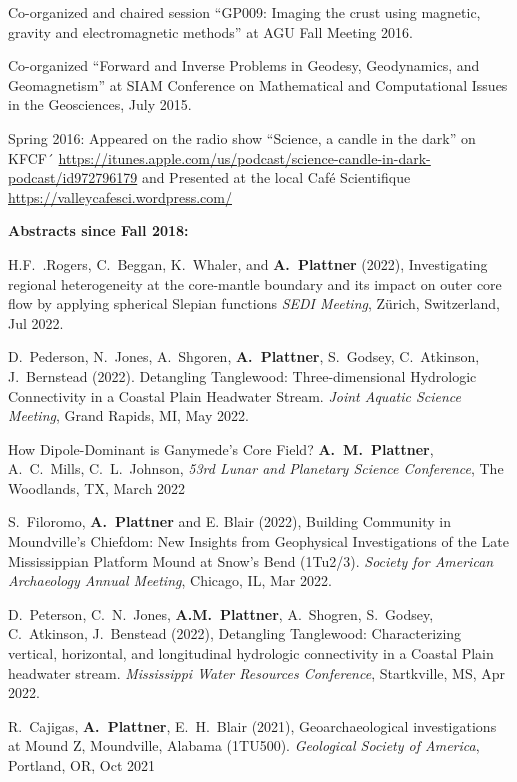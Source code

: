 \documentclass[10pt]{article}
\begin{document}
\spcp
Co-organized and chaired session
``GP009: Imaging the crust using magnetic, gravity and electromagnetic methods''
at AGU Fall Meeting 2016.

\spcp Co-organized ``Forward and Inverse Problems in Geodesy,
Geodynamics, and Geomagnetism'' at SIAM Conference on Mathematical and
Computational Issues in the Geosciences, July 2015.

\spcp
Spring 2016: Appeared on the radio show ``Science, a candle in the dark'' on KFCF´
\url{https://itunes.apple.com/us/podcast/science-candle-in-dark-podcast/id972796179} and Presented at the local Caf\'e Scientifique \url{https://valleycafesci.wordpress.com/}


\spc
\textbf{\tsize Abstracts since Fall 2018:}

\spcp H.F.~.Rogers, C.~Beggan, K.~Whaler, and \textbf{A.~Plattner}
(2022), Investigating regional heterogeneity at the core-mantle
boundary and its impact on outer core flow by applying spherical
Slepian functions \emph{SEDI Meeting}, Z\"urich, Switzerland, Jul 2022.

\spcp D.~Pederson, N.~Jones, A.~Shgoren, \textbf{A.~Plattner},
S.~Godsey, C.~Atkinson, J.~Bernstead (2022). Detangling Tanglewood:
Three-dimensional Hydrologic Connectivity in a Coastal Plain Headwater
Stream. \emph{Joint Aquatic Science Meeting}, Grand Rapids, MI, May
2022.

\spcp How Dipole-Dominant is Ganymede’s Core Field?
\textbf{A.~M.~Plattner}, A.~C.~Mills, C.~L.~Johnson, \emph{53rd Lunar
and Planetary Science Conference}, The Woodlands, TX, March 2022

\spcp S.~Filoromo, \textbf{A.~Plattner} and E. Blair (2022), Building
Community in Moundville's Chiefdom: New Insights from Geophysical
Investigations of the Late Mississippian Platform Mound at Snow's Bend
(1Tu2/3). \emph{Society for American Archaeology Annual Meeting}, Chicago,
IL, Mar 2022.

\spcp D.~Peterson, C.~N.~Jones, \textbf{A.M.~Plattner}, A.~Shogren,
S.~Godsey, C.~Atkinson, J.~Benstead (2022), Detangling Tanglewood:
Characterizing vertical, horizontal, and longitudinal hydrologic
connectivity in a Coastal Plain headwater stream. \emph{Mississippi
Water Resources Conference}, Startkville, MS, Apr 2022.

\spcp R.~Cajigas, \textbf{A.~Plattner}, E.~H.~Blair (2021),
Geoarchaeological investigations at Mound Z, Moundville, Alabama
(1TU500). \emph{Geological Society of America}, Portland, OR, Oct 2021
\end{document}
